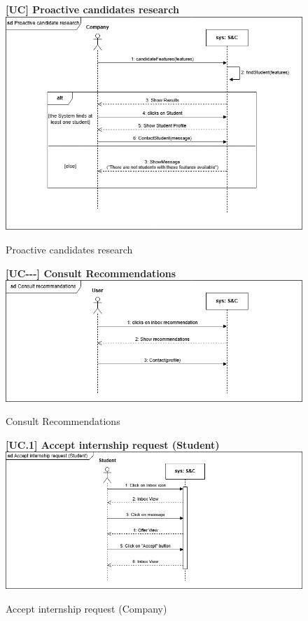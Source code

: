 \begin{figure}[H]
\textbf{[UC\nextUCDiagr] Proactive candidates research}\newline\newline
\includegraphics[width=15cm]{Images/UC_diagram/RASD-UC12.drawio.png}
    \caption{Proactive candidates research}
\end{figure}

\begin{figure}[H]
\textbf{[UC\nextUCDiagr-\nextUCDiagr-\nextUCDiagr-\nextUCDiagr] Consult Recommendations}\newline\newline
\includegraphics[width=15cm]{Images/UC_diagram/RASD-UC13.drawio.png}
    \caption{Consult Recommendations}
\end{figure}

\begin{figure}[H]
\textbf{[UC\nextUCDiagr.1] Accept internship request (Student)}\newline\newline
\includegraphics[width=15cm]{Images/UC_diagram/RASD-UC14.drawio.png}
    \caption{Accept internship request (Company)}
\end{figure}

